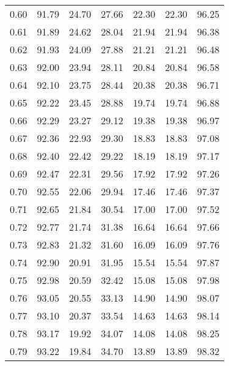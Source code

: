\begin{tabular}{|c|c|c|c|c|c|c|}
      0.60 &     91.79 &     24.70 &      27.66 &   22.30 &      22.30 &         96.25 \\
      0.61 &     91.89 &     24.62 &      28.04 &   21.94 &      21.94 &         96.38 \\
      0.62 &     91.93 &     24.09 &      27.88 &   21.21 &      21.21 &         96.48 \\
      0.63 &     92.00 &     23.94 &      28.11 &   20.84 &      20.84 &         96.58 \\
      0.64 &     92.10 &     23.75 &      28.44 &   20.38 &      20.38 &         96.71 \\
      0.65 &     92.22 &     23.45 &      28.88 &   19.74 &      19.74 &         96.88 \\
      0.66 &     92.29 &     23.27 &      29.12 &   19.38 &      19.38 &         96.97 \\
      0.67 &     92.36 &     22.93 &      29.30 &   18.83 &      18.83 &         97.08 \\
      0.68 &     92.40 &     22.42 &      29.22 &   18.19 &      18.19 &         97.17 \\
      0.69 &     92.47 &     22.31 &      29.56 &   17.92 &      17.92 &         97.26 \\
      0.70 &     92.55 &     22.06 &      29.94 &   17.46 &      17.46 &         97.37 \\
      0.71 &     92.65 &     21.84 &      30.54 &   17.00 &      17.00 &         97.52 \\
      0.72 &     92.77 &     21.74 &      31.38 &   16.64 &      16.64 &         97.66 \\
      0.73 &     92.83 &     21.32 &      31.60 &   16.09 &      16.09 &         97.76 \\
      0.74 &     92.90 &     20.91 &      31.95 &   15.54 &      15.54 &         97.87 \\
      0.75 &     92.98 &     20.59 &      32.42 &   15.08 &      15.08 &         97.98 \\
      0.76 &     93.05 &     20.55 &      33.13 &   14.90 &      14.90 &         98.07 \\
      0.77 &     93.10 &     20.37 &      33.54 &   14.63 &      14.63 &         98.14 \\
      0.78 &     93.17 &     19.92 &      34.07 &   14.08 &      14.08 &         98.25 \\
      0.79 &     93.22 &     19.84 &      34.70 &   13.89 &      13.89 &         98.32 \\

\end{tabular}
